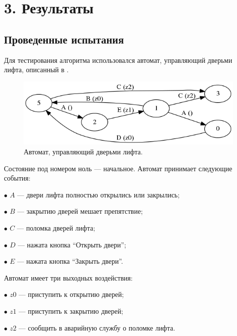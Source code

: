 \documentclass[12pt,fleqn]{article}
\begin{document}
\section{3. Результаты}

\subsection{Проведенные испытания}

Для тестирования алгоритма использовался автомат, управляющий дверьми лифта, описанный в \cite[Sec 2.3.1]{eg}.

\begin{figure}[!hb]
  \centering
    \includegraphics[scale=0.5]{lift.png}
  \caption{Автомат, управляющий дверьми лифта.}
\end{figure}

Состояние под номером ноль --- начальное. Автомат принимает следующие события:

$\bullet$ $A$ --- двери лифта полностью открылись или закрылись;

$\bullet$ $B$ --- закрытию дверей мешает препятствие;

$\bullet$ $C$ --- поломка дверей лифта;

$\bullet$ $D$ --- нажата кнопка ``Открыть двери'';

$\bullet$ $E$ --- нажата кнопка ``Закрыть двери''.

Автомат имеет три выходных воздействия:

$\bullet$ $z0$ --- приступить к открытию дверей;

$\bullet$ $z1$ --- приступить к закрытию дверей;

$\bullet$ $z2$ --- сообщить в аварийную службу о поломке лифта.
\end{document}

